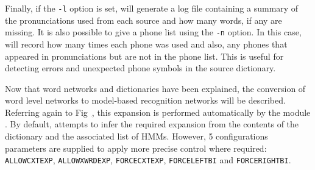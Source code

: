 Finally, if the \texttt{-l} option is set, 
 will generate a log file containing
a summary of the pronunciations used from each source and
how many words, if any are missing.  It is also possible to
give  a phone list using the \texttt{-n} option.
In this case,  will record how many times each phone
was used and also, any phones that appeared in pronunciations but
are not in the phone list.  This is useful for detecting errors and 
unexpected phone symbols in the source dictionary.


Now that word networks and dictionaries have been explained, 
the conversion of word level networks
to model-based recognition networks will be described.  Referring
again to Fig~\href{f:recsys}, this expansion
is performed automatically by the module .  By default,
 attempts to infer the required expansion from the
contents of the dictionary and the associated list of HMMs.
However, 5 configurations parameters are supplied to apply
more precise control where required:
\texttt{ALLOWCXTEXP}, 
\texttt{ALLOWXWRDEXP}, 
\texttt{FORCECXTEXP}, 
\texttt{FORCELEFTBI} and
\texttt{FORCERIGHTBI}.

